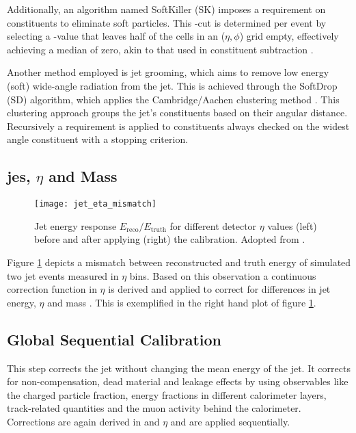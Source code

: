 Additionally, an algorithm named SoftKiller (SK) imposes a \pt requirement on constituents to eliminate soft particles. This \pt-cut is determined per event by selecting a \pt-value that leaves half of the cells in an ($\eta,\phi$) grid empty, effectively achieving a median \pt of zero, akin to that used in constituent subtraction \citep{ATLAS-CONF-2017-065}.

Another method employed is jet grooming, which aims to remove low energy (soft) wide-angle radiation from the jet. This is achieved through the SoftDrop (SD) algorithm, which applies the Cambridge/Aachen clustering method \citep{Larkoski_2014}. This clustering approach groups the jet's constituents based on their angular distance. Recursively a \pt requirement is applied to constituents always checked on the widest angle constituent with a stopping criterion.






\subsection{\ac{jes}, $\eta$ and Mass}
\begin{figure}
  \centering
  \texttt{[image: jet\_eta\_mismatch]}
  \caption[]{Jet energy response $E_\text{reco}/E_\text{truth}$ for different detector $\eta$ values (left) before and after applying (right) the calibration. Adopted from \citep{jet_eta_calib}.}
  \label{fig:jet_eta_mismatch}
\end{figure}
Figure \ref{fig:jet_eta_mismatch} depicts a mismatch between reconstructed and truth energy of simulated two jet events measured in $\eta$ bins. Based on this observation a continuous correction function in $\eta$ is derived and applied to correct for differences in jet energy, $\eta$ and mass \citep{atlas2011jet,Aaboud:2019aa}. This is exemplified in the right hand plot of figure \ref{fig:jet_eta_mismatch}.

\subsection{Global Sequential Calibration}
This step corrects the jet \pt without changing the mean energy of the jet. It corrects for non-compensation, dead material and leakage effects by using observables like the charged particle fraction, energy fractions in different calorimeter layers, track-related quantities and the muon activity behind the calorimeter. Corrections are again derived in \pt and $\eta$ and are applied sequentially.

